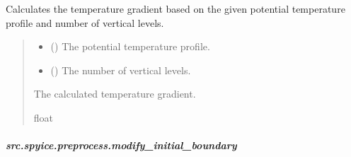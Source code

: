 \documentclass[a4paper,11pt,english,openany]{sphinxmanual}
\begin{document}
\begin{fulllineitems}
\label{\detokenize{api/spyice.preprocess.initial_boundary_conditions:src.spyice.preprocess.initial_boundary_conditions.temperature_gradient}}
\pysigstartsignatures
\pysiglinewithargsret
{}
{\sphinxparamcomma {}}
{}
\pysigstopsignatures
\sphinxAtStartPar
Calculates the temperature gradient based on the given potential temperature profile and number of vertical levels.
\begin{quote}\begin{description}
\begin{itemize}
\item {} 
\sphinxAtStartPar
{} () \textendash{} The potential temperature profile.

\item {} 
\sphinxAtStartPar
{} () \textendash{} The number of vertical levels.

\end{itemize}

\sphinxAtStartPar
The calculated temperature gradient.

\sphinxAtStartPar
float

\sphinxAtStartPar
{} \textendash{} 

\end{description}\end{quote}

\end{fulllineitems}


\sphinxstepscope


\subparagraph{src.spyice.preprocess.modify\_initial\_boundary}
\label{\detokenize{api/spyice.preprocess.modify_initial_boundary:module-src.spyice.preprocess.modify_initial_boundary}}\label{\detokenize{api/spyice.preprocess.modify_initial_boundary:src-spyice-preprocess-modify-initial-boundary}}\label{\detokenize{api/spyice.preprocess.modify_initial_boundary::doc}}
\end{document}
